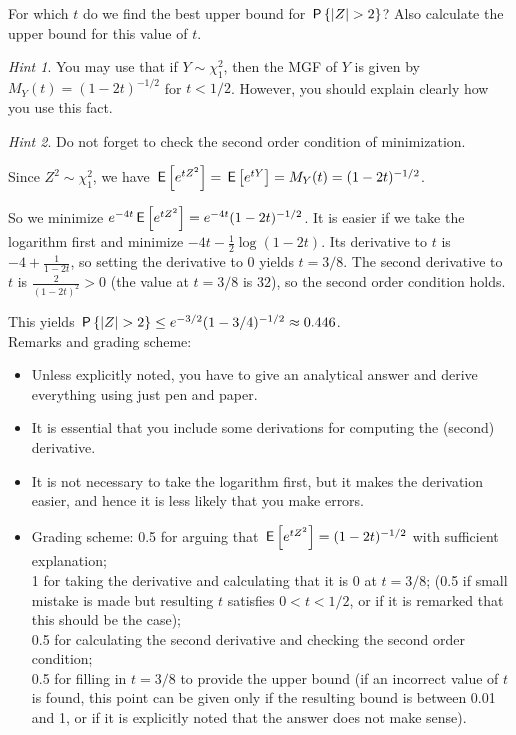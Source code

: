 \begin{exercise}[2.5]
For which $t$ do we find the best upper bound for  $\P{|Z| > 2}$? Also calculate the upper bound for this value of $t$.

\textit{Hint 1}. You may use that if $Y \sim \chi^2_1$, then the MGF of $Y$ is given by $M_Y(t) = (1-2t)^{-1/2}$ for $t < 1/2$. However, you should explain clearly how you use this fact.

\textit{Hint 2}. Do not forget to check the second order condition of minimization. \\
\begin{solution}
Since $Z^2 \sim \chi^2_1$, we have $\E{e^{t Z^2}}  = \E{e^{t Y}} = M_Y(t) =  (1-2t)^{-1/2}$. 

So we minimize $ e^{-4t}\E{e^{t Z^2}} = e^{-4t}(1-2t)^{-1/2}$. It is easier if we take the logarithm first and minimize $-4t - \tfrac12 \log(1-2t)$. Its derivative to $t$ is $-4 + \frac1{1-2t}$, so setting the derivative to 0 yields $t = 3/8$. The second derivative to $t$ is  $\frac{2}{(1-2t)^2} > 0$ (the value at $t=3/8$ is $32$), so the second order condition holds.


This yields $\P{|Z| > 2} \leq e^{-3/2}(1-3/4)^{-1/2} \approx 0.446$. \\

\noindent Remarks and grading scheme:
\begin{itemize}
\item Unless explicitly noted, you have to give an analytical answer and derive everything using just pen and paper. 
\item It is essential that you include some derivations for computing the (second) derivative. 
\item It is not necessary to take the logarithm first, but it makes the derivation easier, and hence it is less likely that you make errors. 
\item Grading scheme: 0.5 for arguing that $\E{e^{t Z^2}}  =  (1-2t)^{-1/2}$ with sufficient explanation; \\ 
1 for taking the derivative and calculating that it is 0 at $t=3/8$; (0.5 if small mistake is made but resulting $t$ satisfies $0 < t < 1/2$, or if it is remarked that this should be the case); \\ 
0.5 for calculating the second derivative and checking the second order condition; \\
0.5 for filling in $t=3/8$ to provide the upper bound (if an incorrect value of $t$ is found, this point can be given only if the resulting bound is between 0.01 and 1, or if it is explicitly noted that the answer does not make sense). 
\end{itemize}
\end{solution}
\end{exercise}


